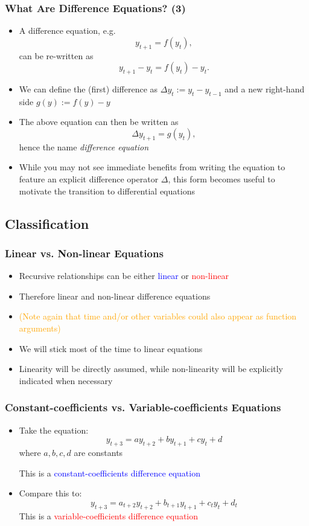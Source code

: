\documentclass[10pt,usenames,dvipsnames]{beamer}
\theoremstyle{definition}
\begin{document}
\begin{frame}[fragile]
	\frametitle{What Are Difference Equations? (3)}
	\begin{itemize}
		\item A difference equation, e.g. \[ y_{t+1} = f(y_t), \] 
		can be re-written as 
		\[ y_{t+1} - y_t = f(y_t) - y_t. \] 
		\item We can define the (first) difference as $ \Delta y_{t} := y_{t} - y_{t-1} $
	and a new right-hand side $ g(y):= f(y)-y$
		\item The above equation can then be written as 
		\[ \Delta y_{t+1} = g(y_t), \]
		hence the name \textit{difference equation}
		\item While you may not see immediate benefits from writing the equation to feature an explicit difference operator $ \Delta $, this form becomes useful to motivate the transition to differential equations
	\end{itemize}
\end{frame}


\subsection{Classification}
\begin{frame}[fragile]
\frametitle{Linear vs. Non-linear Equations}
\begin{itemize}
	\item Recursive relationships can be either \textcolor{blue}{linear} or \textcolor{red}{non-linear}
	\item Therefore linear and non-linear difference equations
	\item \textcolor{orange}{(Note again that time and/or other variables could also appear as function arguments)}
	\item We will stick most of the time to linear equations
	\item Linearity will be directly assumed, while non-linearity will be explicitly indicated when necessary 
\end{itemize}
\end{frame}

\begin{frame}[fragile]
\frametitle{Constant-coefficients vs. Variable-coefficients Equations}
\begin{itemize}
	\item Take the equation: 
	\[
		y_{t+3} = ay_{t+2} + by_{t+1} + cy_{t} + d
	\]
	where $a,b,c,d$ are constants

	This is a \textcolor{blue}{constant-coefficients difference equation}
	
	\item Compare this to: 
	\[
		y_{t+3} = a_{t+2}y_{t+2} + b_{t+1}y_{t+1} + c_{t}y_{t} + d_{t}
	\]
	This is a \textcolor{red}{variable-coefficients difference equation}
\end{itemize}
\end{frame}
\end{document}

